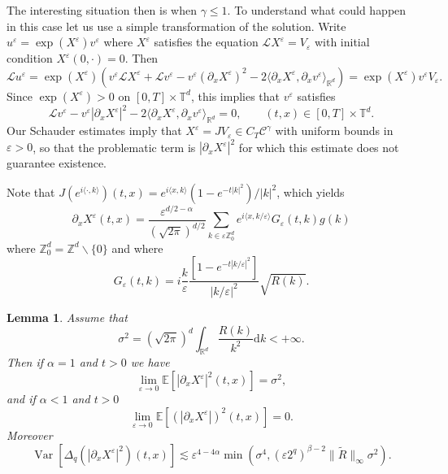 \documentclass[a4paper,11pt]{article}
\newcommand{\mathd}{\mathrm{d}}
\newcommand{\tmop}[1]{\ensuremath{\operatorname{#1}}}
\newtheorem{lemma}{Lemma}
{\theorembodyfont{\rmfamily}\newtheorem{remark}{Remark}}
\newcommand{\LL}{\mathscr{L}}
\newcommand{\CC}{\mathscr{C}}
\begin{document}
The interesting situation then is when $\gamma \leqslant 1$. To understand
what could happen in this case let us use a simple transformation of the
solution. Write $u^{\varepsilon} = \exp (X^{\varepsilon}) v^{\varepsilon}$
where $X^{\varepsilon}$ satisfies the equation $\LL X^{\varepsilon} =
V_{\varepsilon}$ with initial condition $X^{\varepsilon} (0, \cdot) = 0$. Then
\[ \LL u^{\varepsilon} = \exp (X^{\varepsilon}) \left( v^{\varepsilon} \LL
   X^{\varepsilon} + \LL v^{\varepsilon} - v^{\varepsilon} (\partial_x
   X^{\varepsilon})^2 - 2 \langle \partial_x X^{\varepsilon}, \partial_x
   v^{\varepsilon} \rangle_{\mathbb{R}^d} \right) = \exp (X^{\varepsilon})
   v^{\varepsilon} V_{\varepsilon} . \]
Since $\exp (X^{\varepsilon}) > 0$ on $[0, T] \times \mathbb{T}^d$, this
implies that $v^{\varepsilon}$ satisfies
\[ \LL v^{\varepsilon} - v^{\varepsilon} | \partial_x X^{\varepsilon} |^2 - 2
   \langle \partial_x X^{\varepsilon}, \partial_x v^{\varepsilon}
   \rangle_{\mathbb{R}^d} = 0, \hspace{2em} (t, x) \in [0, T] \times
   \mathbb{T}^d . \]
Our Schauder estimates imply that $X^{\varepsilon} = J V_\varepsilon \in C_T \CC^{\gamma}$ with
uniform bounds in $\varepsilon > 0$, so that the problematic term is $|
\partial_x X^{\varepsilon} |^2$ for which this estimate does not guarantee
existence.

Note that $J (e^{i\langle \cdot, k \rangle})(t,x) = e^{i\langle x, k \rangle} (1 - e^{-t |k|^2})/|k|^2$, which yields
\begin{equation} \label{eq:formula-X}
  \partial_x X^{\varepsilon} (t, x) = \frac{\varepsilon^{d / 2 -
  \alpha}}{( \sqrt{2 \pi} )^{d / 2}} \sum_{k \in \varepsilon
  \mathbb{Z}^d_0} e^{i \langle x, k / \varepsilon \rangle} G_{\varepsilon}
  (t, k) g (k)
\end{equation}
where $\mathbb{Z}^d_0 =\mathbb{Z}^d \backslash \{ 0 \}$ and where
\[ G_{\varepsilon} (t, k) = i \frac{k}{\varepsilon} \frac{[1 - e^{- t | k /
   \varepsilon |^2}]}{| k / \varepsilon |^2} \sqrt{R (k)} . \]
\begin{lemma}\label{lem:Dx squared reg}
  Assume that
  \[ \sigma^2 = ( \sqrt{2 \pi} )^d \int_{\mathbb{R}^d} \frac{R
     (k)}{k^2} \mathd k < + \infty . \]
  Then if $\alpha = 1$ and $t>0$ we have
  \[ \lim_{\varepsilon \rightarrow 0} \mathbb{E} [| \partial_x
     X^{\varepsilon} |^2 (t, x)] = \sigma^2, \]
  and if $\alpha < 1$ and $t>0$
  \[ \lim_{\varepsilon \rightarrow 0} \mathbb{E} [(| \partial_x
     X^{\varepsilon} |)^2 (t, x)] = 0. \]
  Moreover 
  \[ \tmop{Var} [\Delta_q (| \partial_x X^{\varepsilon} |^2) (t, x)] \lesssim \varepsilon^{4 - 4 \alpha} \min(\sigma^4,  (\varepsilon 2^q)^{\beta - 2}  \| \tilde R \|_{\infty} \sigma^2)
     . \]
\end{lemma}
\end{document}
